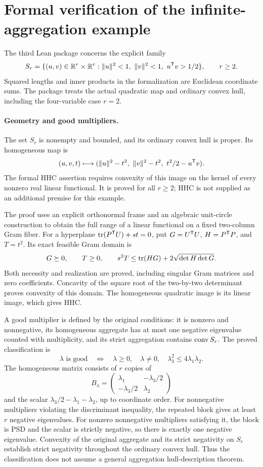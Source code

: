 \section{Formal verification of the infinite-aggregation example}
\label{sec:formal-infinite-aggregation}

The third Lean package concerns the explicit family
\[
 S_r=\{(u,v)\in\mathbb R^r\times\mathbb R^r:
 \|u\|^2<1,\ \|v\|^2<1,\ u^{\mathsf T} v>1/2\},\qquad r\geq2.
\]
Squared lengths and inner products in the formalization are Euclidean
coordinate sums. The package treats the actual quadratic map and ordinary
convex hull, including the four-variable case $r=2$.

\paragraph{Geometry and good multipliers.}
The set $S_r$ is nonempty and bounded, and its ordinary convex hull is
proper. Its homogeneous map is
\[
 (u,v,t)\longmapsto
 (\|u\|^2-t^2,\ \|v\|^2-t^2,\ t^2/2-u^{\mathsf T} v).
\]
The formal HHC assertion requires convexity of this image on the kernel of
every nonzero real linear functional. It is proved for all $r\geq2$;
HHC is not supplied as an additional premise for this example.

The proof uses an explicit orthonormal frame and an algebraic unit-circle
construction to obtain the full range of a linear functional on a fixed
two-column Gram fiber. For a hyperplane
$\operatorname{tr}(P^{\mathsf T} U)+st=0$, put $G=U^{\mathsf T} U$, $H=P^{\mathsf T} P$,
and $T=t^2$. Its exact feasible Gram domain is
\[
 G\succeq0,\qquad T\geq0,\qquad
 s^2T\leq\operatorname{tr}(HG)+2\sqrt{\det H\det G}.
\]
Both necessity and realization are proved, including singular Gram
matrices and zero coefficients. Concavity of the square root of the
two-by-two determinant proves convexity of this domain. The homogeneous
quadratic image is its linear image, which gives HHC.

A good multiplier is defined by the original conditions: it is nonzero
and nonnegative, its homogeneous aggregate has at most one negative
eigenvalue counted with multiplicity, and its strict aggregation contains
$\operatorname{conv} S_r$. The proved classification is
\[
 \lambda\text{ is good}
 \quad\Longleftrightarrow\quad
 \lambda\geq0,\quad\lambda\ne0,\quad
 \lambda_3^2\leq4\lambda_1\lambda_2.
\]
The homogeneous matrix consists of $r$ copies of
\[
 B_\lambda=\begin{pmatrix}\lambda_1&-\lambda_3/2\\
                         -\lambda_3/2&\lambda_2\end{pmatrix}
\]
and the scalar $\lambda_3/2-\lambda_1-\lambda_2$, up to coordinate order.
For nonnegative multipliers violating the discriminant inequality, the
repeated block gives at least $r$ negative eigenvalues. For nonzero
nonnegative multipliers satisfying it, the block is PSD and the scalar is
strictly negative, so there is exactly one negative eigenvalue. Convexity of the
original aggregate and its strict negativity on $S_r$ establish strict
negativity throughout the ordinary convex hull. Thus the classification
does not assume a general aggregation hull-description theorem.

